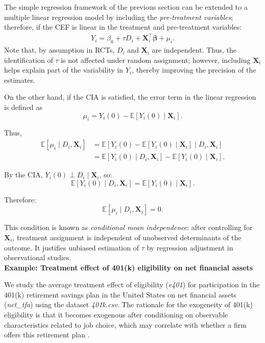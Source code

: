 The simple regression framework of the previous section can be extended to a multiple linear regression model by including the \textit{pre-treatment variables}; therefore, if the CEF is linear in the treatment and pre-treatment variables:
\begin{align*}
	Y_i = \beta_0 + \tau D_i + \mathbf{X}_i^{\top}\boldsymbol{\beta} + \mu_i.
\end{align*}
Note that, by assumption in RCTs, $D_i$ and $\mathbf{X}_i$ are independent. Thus, the identification of $\tau$ is not affected under random assignment; however, including $\mathbf{X}_i$ helps explain part of the variability in $Y_i$, thereby improving the precision of the estimates.

On the other hand, if the CIA is satisfied, the error term in the linear regression is defined as
\[
\mu_i = Y_i(0) - \mathbb{E}[Y_i(0) \mid \mathbf{X}_i].
\]

Thus,
\begin{align*}
\mathbb{E}[\mu_i \mid D_i, \mathbf{X}_i] & = \mathbb{E}[Y_i(0) - \mathbb{E}[Y_i(0) \mid \mathbf{X}_i] \mid D_i, \mathbf{X}_i]\\ 
& = \mathbb{E}[Y_i(0) \mid D_i, \mathbf{X}_i] - \mathbb{E}[Y_i(0) \mid \mathbf{X}_i].
\end{align*}

By the CIA, $Y_i(0) \perp D_i \mid \mathbf{X}_i$, so:
\[
\mathbb{E}[Y_i(0) \mid D_i, \mathbf{X}_i] = \mathbb{E}[Y_i(0) \mid \mathbf{X}_i].
\]

Therefore:
\begin{equation*}
	\mathbb{E}[\mu_i \mid D_i, \mathbf{X}_i] = 0.
\end{equation*}

This condition is known as \textit{conditional mean independence}: after controlling for $\mathbf{X}_i$, treatment assignment is independent of unobserved determinants of the outcome. It justifies unbiased estimation of $\tau$ by regression adjustment in observational studies.\\

\textbf{Example: Treatment effect of 401(k) eligibility on net financial assets}

We study the average treatment effect of eligibility (\textit{e401}) for participation in the 401(k) retirement savings plan in the United States on net financial assets (\textit{net\_tfa}) using the dataset \textit{401k.csv}. The rationale for the exogeneity of 401(k) eligibility is that it becomes exogenous after conditioning on observable characteristics related to job choice, which may correlate with whether a firm offers this retirement plan \cite{chernozhukov2024applied}.

